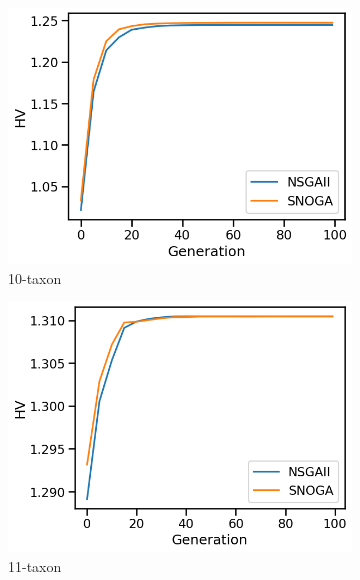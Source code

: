 \begin{figure}[!htbp]
	\centering
		\begin{subfigure}[b]{0.3\textwidth}
			\includegraphics[width=\textwidth]{Figure/10-taxon_hv}
			\caption{10-taxon}
		\end{subfigure}%
		\begin{subfigure}[b]{0.3\textwidth}
			\includegraphics[width=\textwidth]{Figure/11-taxon_hv}
			\caption{11-taxon}
		\end{subfigure}%
		\begin{subfigure}[b]{0.3\textwidth}

\end{subfigure}
\end{figure}
